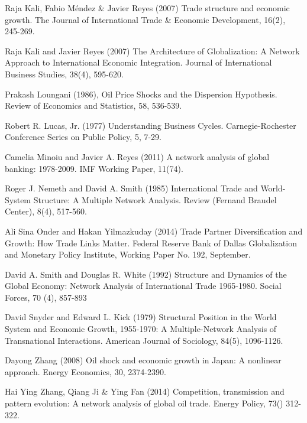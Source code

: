 \documentclass[10pt,letterpaper]{article}
\begin{document}
\begin{thebibliography}{9}
Raja Kali, Fabio M\'endez \& Javier Reyes (2007) Trade structure and economic growth. The Journal of International Trade \& Economic Development, 16(2), 245-269.

Raja Kali and Javier Reyes (2007) The Architecture of Globalization: A Network Approach to International Economic Integration. Journal of International Business Studies, 38(4), 595-620.

Prakash Loungani (1986), Oil Price Shocks and the Dispersion Hypothesis. Review of Economics and Statistics, 58, 536-539.

Robert R. Lucas, Jr. (1977) Understanding Business Cycles. Carnegie-Rochester Conference Series on Public Policy, 5, 7-29. 

Camelia Minoiu and Javier A. Reyes (2011) A network analysis of global banking: 1978-2009. IMF Working Paper, 11(74).

Roger J. Nemeth and David A. Smith (1985) International Trade and World-System Structure: A Multiple Network Analysis. Review (Fernand Braudel Center), 8(4), 517-560.

Ali Sina Onder and Hakan Yilmazkuday (2014) Trade Partner Diversification and Growth: How Trade Links Matter. Federal Reserve Bank of Dallas Globalization and Monetary Policy Institute, Working Paper No. 192, September. 

David A. Smith and Douglas R. White (1992) Structure and Dynamics of the Global Economy: Network Analysis of International Trade 1965-1980. Social Forces, 70 (4), 857-893

David Snyder and Edward L. Kick (1979) Structural Position in the World System and Economic Growth, 1955-1970: A Multiple-Network Analysis of Transnational Interactions. American Journal of Sociology, 84(5), 1096-1126.

Dayong Zhang (2008) Oil shock and economic growth in Japan: A nonlinear approach. Energy Economics, 30, 2374-2390.

Hai Ying Zhang, Qiang Ji \& Ying Fan (2014) Competition, transmission and pattern evolution: A network analysis of global oil trade. Energy Policy, 73() 312-322.

\end{thebibliography} 
\end{document}
